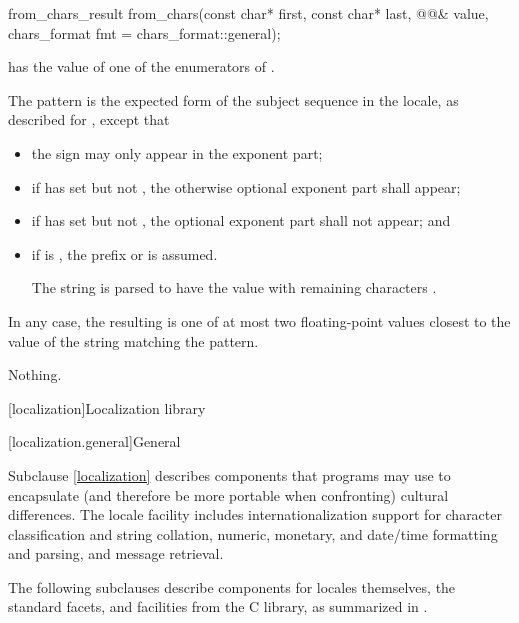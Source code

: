 %
\begin{itemdecl}
from_chars_result from_chars(const char* first, const char* last, @@& value,
                             chars_format fmt = chars_format::general);
\end{itemdecl}

\begin{itemdescr}
\pnum
\expects
{} has the value of
one of the enumerators of .

\pnum
\effects
The pattern is the expected form of the subject sequence
in the  locale,
as described for ,
except that
\begin{itemize}
\item
the sign  may only appear in the exponent part;
\item
if  has  set
but not ,
the otherwise optional exponent part shall appear;
\item
if  has  set
but not ,
the optional exponent part shall not appear; and
\item
if  is ,
the prefix  or  is assumed.
\begin{example}
The string 
is parsed to have the value
with remaining characters .
\end{example}
\end{itemize}
In any case, the resulting  is one of
at most two floating-point values
closest to the value of the string matching the pattern.

\pnum
\throws
Nothing.
\end{itemdescr}


[localization]{Localization library}

[localization.general]{General}

\pnum
Subclause \ref{localization} describes components that \Cpp{} programs may use to
encapsulate (and therefore be more portable when confronting)
cultural differences.
The locale facility includes
internationalization support for character classification and string collation,
numeric, monetary, and date/time formatting and parsing, and
message retrieval.

\pnum
The following subclauses describe components for
locales themselves,
the standard facets, and
facilities from the C library,
as summarized in .

